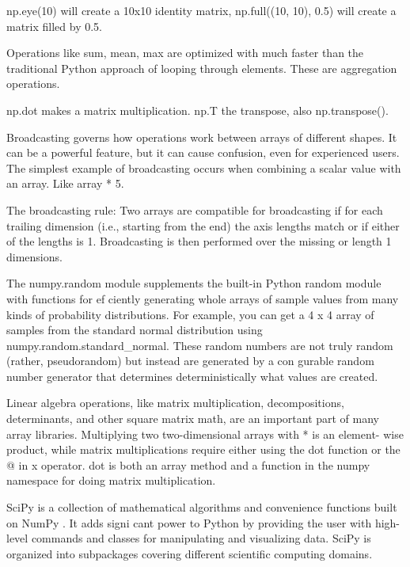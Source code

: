 np.eye(10) will create a 10x10 identity matrix, np.full((10, 10), 0.5) will create a matrix filled by 0.5.

Operations like sum, mean, max are optimized with much
faster than the traditional Python approach of looping
through elements. These are aggregation operations.

np.dot makes a matrix multiplication. np.T the transpose, also np.transpose().

Broadcasting governs how operations work between arrays
of different shapes. It can be a powerful feature, but it can
cause confusion, even for experienced users. The simplest
example of broadcasting occurs when combining a scalar
value with an array. Like array * 5.

The broadcasting rule: Two arrays are compatible for
broadcasting if for each trailing dimension (i.e., starting from
the end) the axis lengths match or if either of the lengths is 1.
Broadcasting is then performed over the missing or length 1
dimensions.

\vspace{10pt}

The numpy.random module supplements the built-in Python
random module with functions for ef ciently generating
whole arrays of sample values from many kinds of probability
distributions. For example, you can get a 4 x 4 array of
samples from the standard normal distribution using
numpy.random.standard\_normal. These random numbers are not truly random (rather,
pseudorandom) but instead are generated by a con gurable
random number generator that determines deterministically what
values are created.

\vspace{10pt}

Linear algebra operations, like matrix multiplication,
decompositions, determinants, and other square matrix
math, are an important part of many array libraries.
Multiplying two two-dimensional arrays with * is an element-
wise product, while matrix multiplications require either
using the dot function or the @ in x operator. dot is both an
array method and a function in the numpy namespace for
doing matrix multiplication.

\vspace{10pt}

SciPy is a collection of mathematical algorithms and convenience functions built on
NumPy . It adds signi cant power to Python by providing the user with high-level
commands and classes for manipulating and visualizing data. SciPy is organized into
subpackages covering different scientific computing domains.